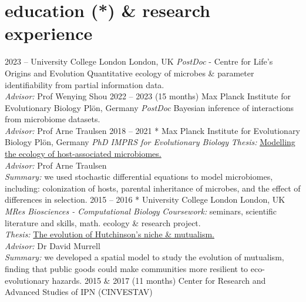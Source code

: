 \documentclass[]{friggeri-cv} %
\begin{document}
\section{education (*) \& research experience}
\begin{entrylist}
\entry
{2023 -- }
{}
{University College London}
{London, UK}
{\emph{PostDoc} - Centre for Life's Origins and Evolution}
{Quantitative ecology of microbes \& parameter identifiability from partial information data. \\ \emph{Advisor:}  Prof Wenying Shou}
\entry
{2022 -- 2023 }
{(15 months)}
{Max Planck Institute for Evolutionary Biology}
{Plön, Germany}
{\emph{PostDoc}}
{Bayesian inference of interactions from microbiome datasets. \\ \emph{Advisor:}  Prof Arne Traulsen}
\entry
{2018 -- 2021}
{}
{* Max Planck Institute for Evolutionary Biology}
{Plön, Germany}
{\emph{PhD {\normalfont IMPRS for Evolutionary Biology}}}
{\emph{Thesis:} \href{https://hdl.handle.net/21.11116/0000-000B-34D5-A}{Modelling the ecology of host-associated microbiomes.} \\ \emph{Advisor:}  Prof Arne Traulsen \\ \emph{Summary:} we used stochastic differential equations to model microbiomes, including: colonization of hosts, parental inheritance of microbes, and the effect of differences in selection.}%
\entry
{2015 -- 2016}
{}
{* University College London}
{London, UK}
{\emph{MRes {\normalfont Biosciences - Computational Biology}}}
{\emph{Coursework:} seminars, scientific literature and skills, math. ecology \& research project. \\
\emph{Thesis:} \href{https://github.com/romanzapien/mres_thesis/blob/main/MResThesis_RomanZapienCampos.pdf}{The evolution of Hutchinson’s niche \& mutualism.} \\ \emph{Advisor:} Dr David Murrell \\ \emph{Summary:} we developed a spatial model to study the evolution of mutualism, finding that public goods could make communities more resilient to eco-evolutionary hazards.}
\entry
{2015 \& 2017}
{(11 months)}
{Center for Research and Advanced Studies of IPN (CINVESTAV)}

\end{entrylist}
\end{document}
